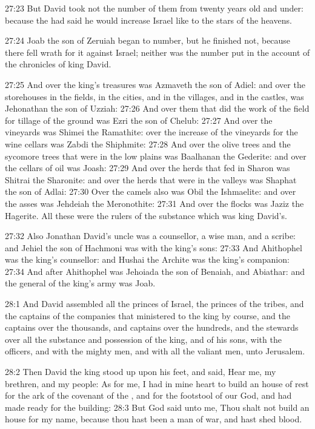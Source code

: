 27:23 But David took not the number of them from twenty years old and under: because the \LORD had said he would increase Israel like to the stars of the heavens.

27:24 Joab the son of Zeruiah began to number, but he finished not, because there fell wrath for it against Israel; neither was the number put in the account of the chronicles of king David.

27:25 And over the king's treasures was Azmaveth the son of Adiel: and over the storehouses in the fields, in the cities, and in the villages, and in the castles, was Jehonathan the son of Uzziah: 27:26 And over them that did the work of the field for tillage of the ground was Ezri the son of Chelub: 27:27 And over the vineyards was Shimei the Ramathite: over the increase of the vineyards for the wine cellars was Zabdi the Shiphmite: 27:28 And over the olive trees and the sycomore trees that were in the low plains was Baalhanan the Gederite: and over the cellars of oil was Joash: 27:29 And over the herds that fed in Sharon was Shitrai the Sharonite: and over the herds that were in the valleys was Shaphat the son of Adlai: 27:30 Over the camels also was Obil the Ishmaelite: and over the asses was Jehdeiah the Meronothite: 27:31 And over the flocks was Jaziz the Hagerite. All these were the rulers of the substance which was king David's.

27:32 Also Jonathan David's uncle was a counsellor, a wise man, and a scribe: and Jehiel the son of Hachmoni was with the king's sons: 27:33 And Ahithophel was the king's counsellor: and Hushai the Archite was the king's companion: 27:34 And after Ahithophel was Jehoiada the son of Benaiah, and Abiathar: and the general of the king's army was Joab.

28:1 And David assembled all the princes of Israel, the princes of the tribes, and the captains of the companies that ministered to the king by course, and the captains over the thousands, and captains over the hundreds, and the stewards over all the substance and possession of the king, and of his sons, with the officers, and with the mighty men, and with all the valiant men, unto Jerusalem.

28:2 Then David the king stood up upon his feet, and said, Hear me, my brethren, and my people: As for me, I had in mine heart to build an house of rest for the ark of the covenant of the \LORD, and for the footstool of our God, and had made ready for the building: 28:3 But God said unto me, Thou shalt not build an house for my name, because thou hast been a man of war, and hast shed blood.

